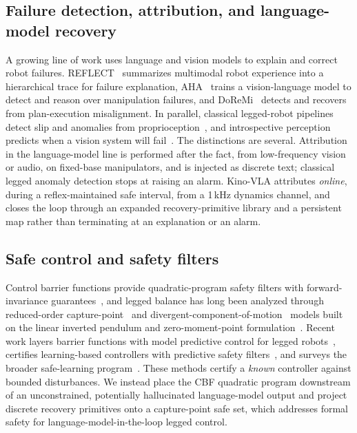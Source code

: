 \documentclass[conference]{IEEEtran}
\newcommand{\kinovla}{Kino-VLA}
\begin{document}
\subsection{Failure detection, attribution, and language-model recovery}
A growing line of work uses language and vision models to explain and correct
robot failures. REFLECT~\cite{liu2023reflect} summarizes multimodal robot
experience into a hierarchical trace for failure explanation, AHA~\cite{duan2025aha}
trains a vision-language model to detect and reason over manipulation failures,
and DoReMi~\cite{guo2024doremi} detects and recovers from plan-execution
misalignment. In parallel, classical legged-robot pipelines detect slip and
anomalies from proprioception~\cite{yan2025slip}, and introspective perception
predicts when a vision system will fail~\cite{daftry2016introspective}. The
distinctions are several. Attribution in the language-model line is performed after
the fact, from low-frequency vision or audio, on fixed-base manipulators, and is
injected as discrete text; classical legged anomaly detection stops at raising an
alarm. \kinovla{} attributes \emph{online}, during a reflex-maintained safe
interval, from a \mbox{1\,kHz} dynamics channel, and closes the loop through an
expanded recovery-primitive library and a persistent map rather than terminating
at an explanation or an alarm.

\subsection{Safe control and safety filters}
Control barrier functions provide quadratic-program safety filters with forward-invariance
guarantees~\cite{ames2017control,ames2019control}, and legged balance has long been
analyzed through reduced-order capture-point~\cite{pratt2006capture} and divergent-component-of-motion~\cite{englsberger2015three}
models built on the linear inverted pendulum and zero-moment-point
formulation~\cite{kajita2003biped}. Recent work layers barrier functions with model
predictive control for legged robots~\cite{grandia2021multi}, certifies learning-based
controllers with predictive safety filters~\cite{wabersich2018linear}, and surveys
the broader safe-learning program~\cite{brunke2022safe}. These methods certify a
\emph{known} controller against bounded disturbances. We instead place the CBF
quadratic program downstream of an unconstrained, potentially hallucinated
language-model output and project discrete recovery primitives onto a capture-point
safe set, which addresses formal safety for language-model-in-the-loop legged
control.
\end{document}

